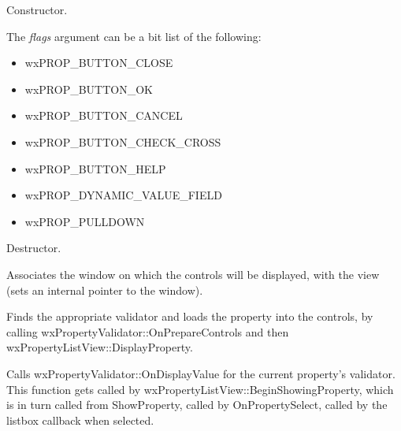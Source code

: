 

Constructor.

The {\it flags} argument can be a bit list of the following:

\begin{itemize}\itemsep=0pt
\item wxPROP\_BUTTON\_CLOSE
\item wxPROP\_BUTTON\_OK
\item wxPROP\_BUTTON\_CANCEL
\item wxPROP\_BUTTON\_CHECK\_CROSS
\item wxPROP\_BUTTON\_HELP
\item wxPROP\_DYNAMIC\_VALUE\_FIELD
\item wxPROP\_PULLDOWN
\end{itemize}



Destructor.

\label{wxpropertylistviewassociatepanel}


Associates the window on which the controls will be displayed, with the view (sets an internal pointer to the window).

\label{wxpropertylistviewbeginshowingproperty}


Finds the appropriate validator and loads the property into the controls, by calling
wxPropertyValidator::OnPrepareControls and then wxPropertyListView::DisplayProperty.

\label{wxpropertylistviewdisplayproperty}


Calls wxPropertyValidator::OnDisplayValue for the current property's validator. This function
gets called by wxPropertyListView::BeginShowingProperty, which is in turn called
from ShowProperty, called by OnPropertySelect, called by the listbox callback when selected.

